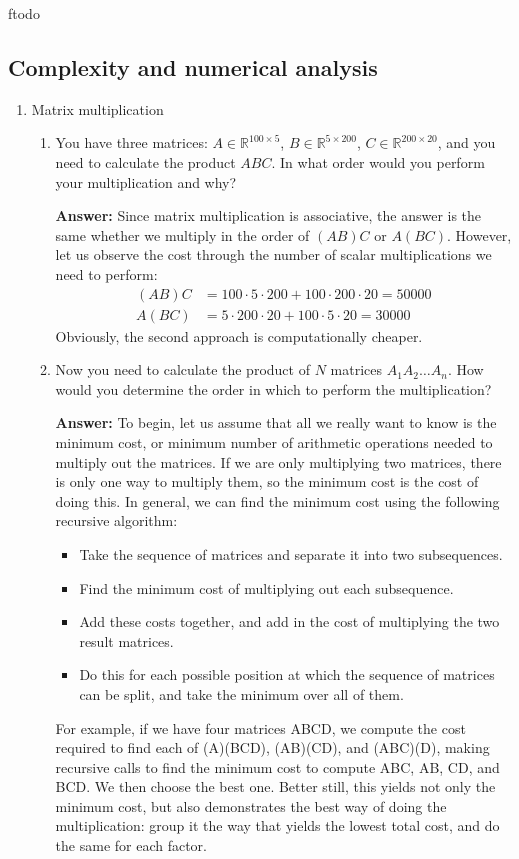 ƒtodo\documentclass{article}
\newenvironment{QandA}{\begin{enumerate}[label=\arabic*.]}{\end{enumerate}}
\newenvironment{InnerQandA}{\begin{enumerate}[label=\roman*.]}{\end{enumerate}}
\newenvironment{answer}{\par\normalfont \textbf{Answer:}}{}
\newcommand{\R}{\mathbb{R}}
\begin{document}
\subsection{Complexity and numerical analysis}
\begin{QandA}
    \item Matrix multiplication
    \begin{InnerQandA}
        \item You have three matrices: $A \in \R^{100 \times 5}$, $B \in \R^{5 \times 200}$, $C \in \R^{200 \times 20}$, and you need to calculate the product $ABC$. In what order would you perform your multiplication and why?
        \begin{answer}
            Since matrix multiplication is associative, the answer is the same whether we multiply in the order of $(AB)C$ or $A(BC)$. However, let us observe the cost through the number of scalar multiplications we need to perform:
            \begin{align*}
                (AB)C &= 100 \cdot 5 \cdot 200 + 100 \cdot 200 \cdot 20 = 50000 \\
                A(BC) &= 5 \cdot 200 \cdot 20 + 100 \cdot 5 \cdot 20 = 30000
            \end{align*}
            Obviously, the second approach is computationally cheaper.
        \end{answer}

        \item Now you need to calculate the product of $N$ matrices  $A_1 A_2 \ldots A_n$. How would you determine the order in which to perform the multiplication?
        \begin{answer}
            To begin, let us assume that all we really want to know is the minimum cost, or minimum number of arithmetic operations needed to multiply out the matrices. If we are only multiplying two matrices, there is only one way to multiply them, so the minimum cost is the cost of doing this. In general, we can find the minimum cost using the following recursive algorithm:
            \begin{itemize}
                \item Take the sequence of matrices and separate it into two subsequences.
                \item Find the minimum cost of multiplying out each subsequence.
                \item Add these costs together, and add in the cost of multiplying the two result matrices.
                \item Do this for each possible position at which the sequence of matrices can be split, and take the minimum over all of them.
            \end{itemize}
            For example, if we have four matrices ABCD, we compute the cost required to find each of (A)(BCD), (AB)(CD), and (ABC)(D), making recursive calls to find the minimum cost to compute ABC, AB, CD, and BCD. We then choose the best one. Better still, this yields not only the minimum cost, but also demonstrates the best way of doing the multiplication: group it the way that yields the lowest total cost, and do the same for each factor.
            

\end{answer}
\end{InnerQandA}
\end{QandA}
\end{document}
